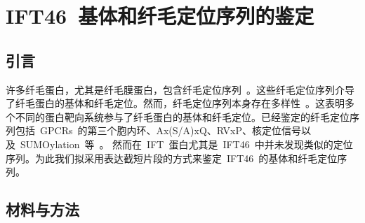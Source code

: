 \chapter{IFT46\ 基体和纤毛定位序列的鉴定}
\renewcommand{\leftmark}{第四章\quad IFT46\ 基体和纤毛定位序列的鉴定}
\section{引言}
许多纤毛蛋白，尤其是纤毛膜蛋白，包含纤毛定位序列\
\citep{Hurd2011,Corbit2005,Berbari2008,Dishinger2010,McIntyre2015,Santos2014}。这些纤毛定位序列介导了纤毛蛋白的基体和纤毛定位。然而，纤毛定位序列本身存在多样性\
\citep{Malicki2014,Bhogaraju2013}。这表明多个不同的蛋白靶向系统参与了纤毛蛋白的基体和纤毛定位。已经鉴定的纤毛定位序列包括\ GPCRs\ 的第三个胞内环、Ax(S/A)xQ、RVxP、核定位信号以及\ SUMOylation\ 等\ \citep{Malicki2014,Bhogaraju2013,McIntyre2015,Dishinger2010,Berbari2008,Hurd2011,Santos2014,Corbit2005}。 然而在\ IFT\ 蛋白尤其是\ IFT46\ 中并未发现类似的定位序列。为此我们拟采用表达截短片段的方式来鉴定\ IFT46\ 的基体和纤毛定位序列。

\section{材料与方法}
